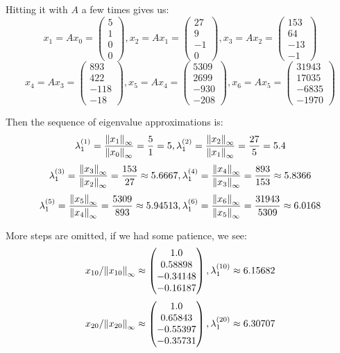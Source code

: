 \documentclass[12pt]{article} %
\newcommand{\1}[1]{\mathds{1}\left[#1\right]}
\begin{document}
Hitting it with $A$ a few times gives us:
$$
	x_1 = Ax_0 = 
	\begin{pmatrix}
	5\\
	1\\
	0\\
	0
	\end{pmatrix},  
	x_2 = Ax_1 = 
	\begin{pmatrix}
	27\\
	9\\
	-1\\
	0
	\end{pmatrix}, 
	x_3 = Ax_2 = 
	\begin{pmatrix}
	153\\
	64\\
	-13\\
	-1
	\end{pmatrix}
$$
$$
	x_4 = Ax_3 = 
	\begin{pmatrix}
	893\\
	422\\
	-118\\
	-18
	\end{pmatrix},
	x_5 = Ax_4 = 
	\begin{pmatrix}
	5309 \\ 2699 \\
	-930 \\ -208
	\end{pmatrix},
	x_6 = Ax_5 = 
	\begin{pmatrix}
	31943\\17035\\-6835\\-1970
	\end{pmatrix}
$$

Then the sequence of eigenvalue approximations is:
$$
	\lambda_1^{(1)} = \frac{\norm{x_1}_{\infty}}{\norm{x_0}_{\infty}} = \frac{5}{1} = 5, 
	\lambda_1^{(2)} = \frac{\norm{x_2}_{\infty}}{\norm{x_1}_{\infty}} = \frac{27}{5} = 5.4
$$
$$
	\lambda_1^{(3)} = \frac{\norm{x_3}_{\infty}}{\norm{x_2}_{\infty}} = \frac{153}{27} \approx 5.6667, 
	\lambda_1^{(4)} = \frac{\norm{x_4}_{\infty}}{\norm{x_3}_{\infty}} = \frac{893}{153} \approx 5.8366
$$
$$
\lambda_1^{(5)} = \frac{\norm{x_5}_{\infty}}{\norm{x_4}_{\infty}} = \frac{5309}{893} \approx 5.94513, 
	\lambda_1^{(6)} = \frac{\norm{x_6}_{\infty}}{\norm{x_5}_{\infty}} = \frac{31943}{5309} \approx 6.0168
$$	

More steps are omitted, if we had some patience, we see:
$$
	x_{10}/\norm{x_{10}}_{\infty} \approx
	\begin{pmatrix}
	1.0\\  0.58898\\ -0.34148\\ -0.16187
	\end{pmatrix}, \lambda_1^{(10)}\approx 6.15682
$$
$$
	x_{20}/\norm{x_{20}}_{\infty} \approx 
	\begin{pmatrix}
	1.0\\  0.65843\\ -0.55397\\ -0.35731
	\end{pmatrix}, \lambda_1^{(20)}\approx 6.30707
$$
\end{document}
